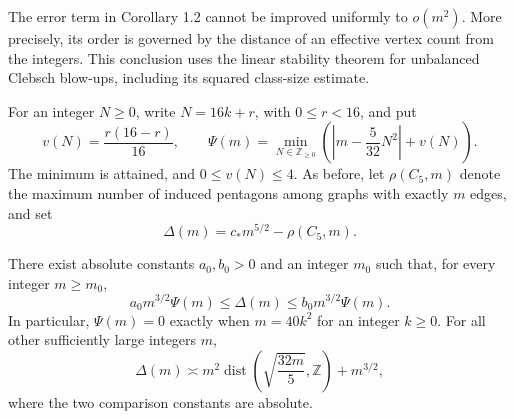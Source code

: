 The error term in Corollary 1.2 cannot be improved uniformly to $o(m^2)$.
More precisely, its order is governed by the distance of an effective vertex
count from the integers. This conclusion uses the linear stability theorem
for unbalanced Clebsch blow-ups, including its squared class-size estimate.

For an integer $N\geq0$, write $N=16k+r$, with $0\leq r<16$, and put
\[
 v(N)=\frac{r(16-r)}{16},\qquad
 \Psi(m)=\min_{N\in\mathbb Z_{\geq0}}
 \left(\left|m-\frac5{32}N^2\right|+v(N)\right).
\]
The minimum is attained, and $0\leq v(N)\leq4$. As before, let
$\rho(C_5,m)$ denote the maximum number of induced pentagons among graphs
with exactly $m$ edges, and set
\[
 \Delta(m)=c_\ast m^{5/2}-\rho(C_5,m).
\]

\begin{theorem}\label{thm:arithmetic-deficit}
There exist absolute constants $a_0,b_0>0$ and an integer $m_0$ such that,
for every integer $m\geq m_0$,
\begin{equation}\tag{51}\label{eq:51}
 a_0m^{3/2}\Psi(m)\leq\Delta(m)\leq b_0m^{3/2}\Psi(m).
\end{equation}
In particular, $\Psi(m)=0$ exactly when $m=40k^2$ for an integer $k\geq0$.
For all other sufficiently large integers $m$,
\begin{equation}\tag{52}\label{eq:52}
 \Delta(m)\asymp m^2\operatorname{dist}
 \left(\sqrt{\frac{32m}5},\mathbb Z\right)+m^{3/2},
\end{equation}
where the two comparison constants are absolute.
\end{theorem}

